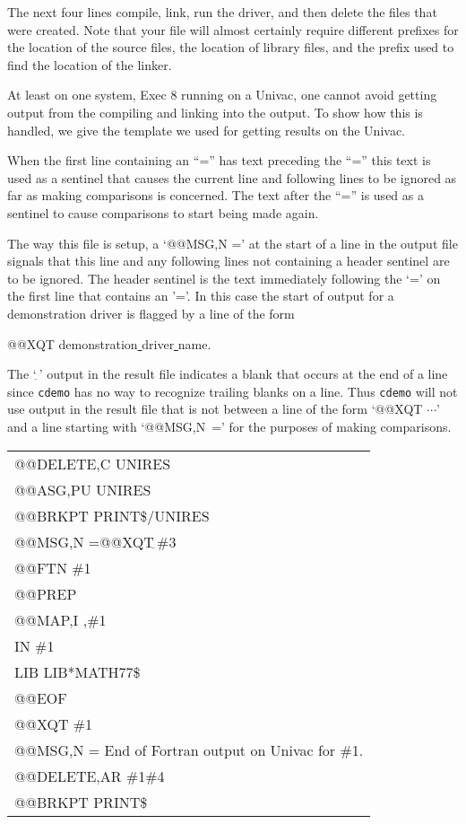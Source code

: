 \documentclass[twoside]{MATH77}
\begin{document}
The next four lines compile, link, run the driver, and then delete the
files that were created.  Note that your file will almost certainly
require different prefixes for the location of the source files, the
location of library files, and the prefix used to find the location of the
linker.

At least on one system, Exec 8 running on a Univac, one cannot avoid
getting output from the compiling and linking into the output.  To show
how this is handled, we give the template we used for getting results on
the Univac.

When the first line containing an ``='' has text preceding the ``='' this
text is used as a sentinel that causes the current line and
following lines to be ignored as far as making comparisons is concerned.
The text after the ``='' is used as a sentinel to cause comparisons to
start being made again.

The way this file is setup, a `@@MSG,N =' at the start of a line in the
output file signals that this line and any following lines not containing
a header sentinel are to be ignored.  The header sentinel is the text
immediately following the `=' on the first line that contains an '='.  In
this case the start of output for a demonstration driver is flagged by a
line of the form

@@XQT demonstration\underline{ }driver\underline{ }name.

The `{\LARGE $_{\tilde{~}}$}' output in the result file indicates a blank
that occurs at the end of a line since {\tt cdemo} has no way to recognize
trailing blanks on a line.  Thus {\tt cdemo} will not use output in the
result file that is not between a line of the form `@@XQT $\cdots $' and a
line starting with `@@MSG,N~=' for the purposes of making comparisons.

\begin{tabular}{l}
@@DELETE,C UNIRES\\
@@ASG,PU UNIRES\\
@@BRKPT PRINT\$/UNIRES\\
@@MSG,N =@@XQT{\LARGE $_{\tilde{~}}$}\#3\\
@@FTN \#1\\
@@PREP\\
@@MAP,I ,\#1\\
IN \#1\\
LIB LIB*MATH77\$\\
@@EOF\\
@@XQT \#1\\
@@MSG,N = End of Fortran output on Univac for \#1.\\
@@DELETE,AR \#1\#4\\
@@BRKPT PRINT\$
\end{tabular}
\end{document}
